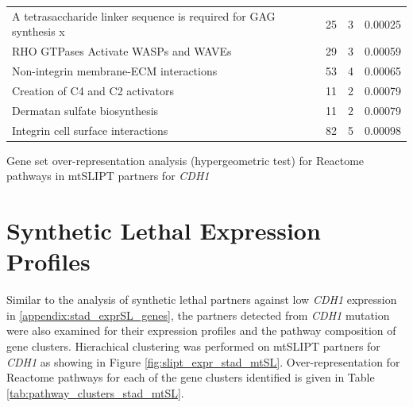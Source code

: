 \begin{table}[!ht]
{\begin{threeparttable}
\begin{tabular}{lccc}
  A tetrasaccharide linker sequence is required for GAG synthesis \textcolor{black!10}{x} &  25 &   3 & 0.00025 \\ 
  \rowcolor{black!5}
  RHO GTPases Activate WASPs and WAVEs &  29 &   3 & 0.00059 \\ 
  \rowcolor{black!10}
  Non-integrin membrane-ECM interactions &  53 &   4 & 0.00065 \\ 
  \rowcolor{black!5}
  Creation of C4 and C2 activators &  11 &   2 & 0.00079 \\ 
  \rowcolor{black!10}
  Dermatan sulfate biosynthesis &  11 &   2 & 0.00079 \\ 
  \rowcolor{black!5}
  Integrin cell surface interactions &  82 &   5 & 0.00098 \\ 
  \hline
\end{tabular}
\begin{tablenotes}
\raggedright \small
Gene set over-representation analysis (hypergeometric test) for Reactome pathways in mtSLIPT partners for \textit{CDH1}
\end{tablenotes}
\end{threeparttable}
}
\end{table}


\FloatBarrier

\section{Synthetic Lethal Expression Profiles} \label{appendix:stad_mtSL_clusters}

Similar to the analysis of synthetic lethal partners against low \textit{CDH1} expression in \ref{appendix:stad_exprSL_genes}, the partners detected from \textit{CDH1} mutation were also examined for their expression profiles and the pathway composition of gene clusters. Hierachical clustering was performed on mtSLIPT partners for \textit{CDH1} as showing in Figure \ref{fig:slipt_expr_stad_mtSL}. Over-representation for Reactome pathways for each of the gene clusters identified is given in Table \ref{tab:pathway_clusters_stad_mtSL}.


